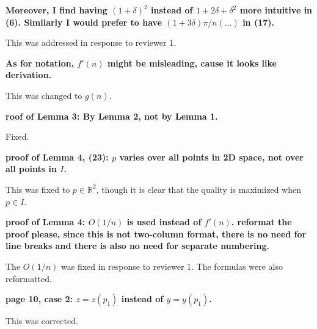 \documentclass[lotsofwhite]{patmorin}
\newenvironment{comment}{\noindent\bf}{}
\newenvironment{response}{\noindent}{}
\begin{document}
\begin{comment}
Moreover, I find having $(1+\delta)^2$ instead of $1 +2\delta +
\delta^2$ more intuitive in (6). Similarly I would prefer to have
$(1+3\delta)\pi/n (...)$ in (17).
\end{comment}

\begin{response}
This was  addressed in response to reviewer 1.
\end{response}

\begin{comment}
As for notation, $f'(n)$ might be misleading, cause it looks like 
derivation.
\end{comment}

\begin{response}
This was changed to $g(n)$.
\end{response}

\begin{comment}
roof of Lemma 3: By Lemma 2, not by Lemma 1.
\end{comment}

\begin{response}
Fixed.
\end{response}

\begin{comment}
proof of Lemma 4, (23): $p$ varies over all points in 2D space, not over all 
points in $I$.
\end{comment}

\begin{response}
This was fixed to $p\in\mathbb{R}^2$, though it is clear that the
quality is maximized when $p\in I$.
\end{response}

\begin{comment}
proof of Lemma 4: $O(1/n)$ is used instead of $f'(n)$.  reformat the
proof please, since this is not two-column format, there is no need
for line breaks and there is also no need for separate numbering.
\end{comment}

\begin{response}
The $O(1/n)$ was fixed in response to reviewer 1.  The formulas were
also reformatted.
\end{response}

\begin{comment}
page 10, case 2: $z = z(p_1)$ instead of $y = y(p_1)$.
\end{comment}

\begin{response}
This was corrected.
\end{response}
\end{document}
